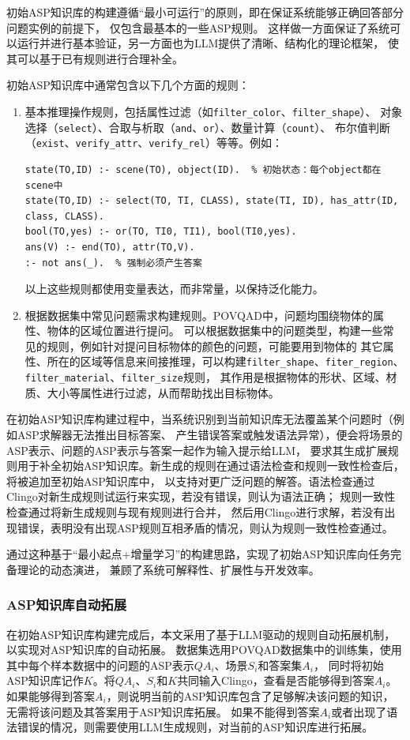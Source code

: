 初始ASP知识库的构建遵循“最小可运行”的原则，即在保证系统能够正确回答部分问题实例的前提下，
仅包含最基本的一些ASP规则。
这样做一方面保证了系统可以运行并进行基本验证，另一方面也为LLM提供了清晰、结构化的理论框架，
使其可以基于已有规则进行合理补全。

初始ASP知识库中通常包含以下几个方面的规则：
\begin{enumerate}[itemsep=0pt,parsep=0pt]
\item 基本推理操作规则，包括属性过滤（如\texttt{filter\_color}、\texttt{filter\_shape}）、
对象选择（\texttt{select}）、合取与析取（\texttt{and}、\texttt{or}）、数量计算（\texttt{count}）、
布尔值判断（\texttt{exist}、\texttt{verify\_attr}、\texttt{verify\_rel}）等等。例如：
\begin{lstlisting}
state(TO,ID) :- scene(TO), object(ID).  % 初始状态：每个object都在scene中
state(TO,ID) :- select(TO, TI, CLASS), state(TI, ID), has_attr(ID, class, CLASS).
bool(TO,yes) :- or(TO, TI0, TI1), bool(TI0,yes).
ans(V) :- end(TO), attr(TO,V).
:- not ans(_).  % 强制必须产生答案
\end{lstlisting}
以上这些规则都使用变量表达，而非常量，以保持泛化能力。
\item 根据数据集中常见问题需求构建规则。POVQAD中，问题均围绕物体的属性、物体的区域位置进行提问。
可以根据数据集中的问题类型，构建一些常见的规则，例如针对提问目标物体的颜色的问题，可能要用到物体的
其它属性、所在的区域等信息来间接推理，可以构建\texttt{filter\_shape}、\texttt{fiter\_region}、
\texttt{filter\_material}、\texttt{filter\_size}规则，
其作用是根据物体的形状、区域、材质、大小等属性进行过滤，从而帮助找出目标物体。
\end{enumerate}

在初始ASP知识库构建过程中，当系统识别到当前知识库无法覆盖某个问题时（例如ASP求解器无法推出目标答案、
产生错误答案或触发语法异常），便会将场景的ASP表示、问题的ASP表示与答案一起作为输入提示给LLM，
要求其生成扩展规则用于补全初始ASP知识库。新生成的规则在通过语法检查和规则一致性检查后，将被追加至初始ASP知识库中，
以支持对更广泛问题的解答。语法检查通过Clingo对新生成规则试运行来实现，若没有错误，则认为语法正确；
规则一致性检查通过将新生成规则与现有规则进行合并，
然后用Clingo进行求解，若没有出现错误，表明没有出现ASP规则互相矛盾的情况，则认为规则一致性检查通过。

通过这种基于“最小起点+增量学习”的构建思路，实现了初始ASP知识库向任务完备理论的动态演进，
兼顾了系统可解释性、扩展性与开发效率。
\subsubsection{ASP知识库自动拓展}
在初始ASP知识库构建完成后，本文采用了基于LLM驱动的规则自动拓展机制，以实现对ASP知识库的自动拓展。
数据集选用POVQAD数据集中的训练集，使用其中每个样本数据中的问题的ASP表示$QA_i$、场景$S_i$和答案集$A_i$，
同时将初始ASP知识库记作$K$。将$QA_i$、$S_i$和$K$共同输入Clingo，查看是否能够得到答案$A_i$。
如果能够得到答案$A_i$，则说明当前的ASP知识库包含了足够解决该问题的知识，无需将该问题及其答案用于ASP知识库拓展。
如果不能得到答案$A_i$或者出现了语法错误的情况，则需要使用LLM生成规则，对当前的ASP知识库进行拓展。

